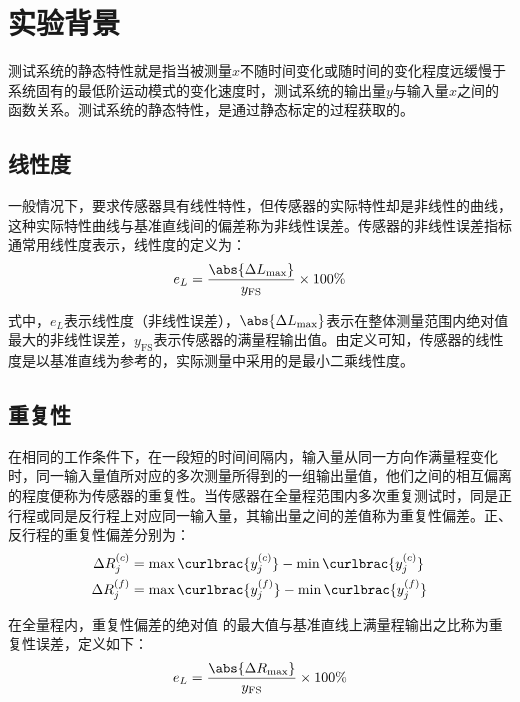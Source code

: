 \documentclass[a4paper,12pt,twoside]{article}%
\begin{document}

\setcounter{page}{1}

\section{实验背景}
测试系统的静态特性就是指当被测量$x$不随时间变化或随时间的变化程度远缓慢于系统固有的最低阶运动模式的变化速度时，测试系统的输出量$y$与输入量$x$之间的函数关系。测试系统的静态特性，是通过静态标定的过程获取的。
\subsection{线性度}
一般情况下，要求传感器具有线性特性，但传感器的实际特性却是非线性的曲线，这种实际特性曲线与基准直线间的偏差称为非线性误差。传感器的非线性误差指标通常用线性度表示，线性度的定义为：
\begin{equation}
  e_L= \frac{\abs{\Delta L_\mathrm{max}}}{y_\mathrm{FS}} \times 100\%
  \label{eq:linearity}
\end{equation}\par
式中，$e_L$表示线性度（非线性误差），$\abs{\Delta L_\mathrm{max}}$表示在整体测量范围内绝对值最大的非线性误差，$y_\mathrm{FS}$表示传感器的满量程输出值。由定义可知，传感器的线性度是以基准直线为参考的，实际测量中采用的是最小二乘线性度。
\subsection{重复性}
在相同的工作条件下，在一段短的时间间隔内，输入量从同一方向作满量程变化时，同一输入量值所对应的多次测量所得到的一组输出量值，他们之间的相互偏离的程度便称为传感器的重复性。当传感器在全量程范围内多次重复测试时，同是正行程或同是反行程上对应同一输入量，其输出量之间的差值称为重复性偏差。正、反行程的重复性偏差分别为：
\begin{equation}
\begin{aligned}
  \Delta R^{(c)}_j &= \max\curlbrac{y_j^{(c)}} - \min\curlbrac{y_j^{(c)}}\\
  \Delta R^{(f)}_j &= \max\curlbrac{y_j^{(f)}} - \min\curlbrac{y_j^{(f)}}
\end{aligned}
\label{eq:repeatability}
\end{equation}\par
在全量程内，重复性偏差的绝对值 的最大值与基准直线上满量程输出之比称为重复性误差，定义如下：
\begin{equation*}
  e_L= \frac{\abs{\Delta R_\mathrm{max}}}{y_\mathrm{FS}} \times 100\%
\end{equation*}\par
\newpage
\end{document}
